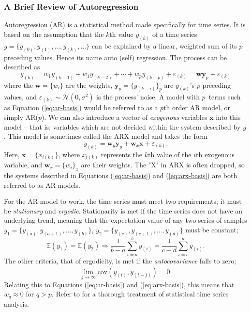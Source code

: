 \documentclass[]{article}
\begin{document}
\subsubsection{A Brief Review of Autoregression} \label{sec:ar-review}
Autoregression (AR) is a statistical method made specifically for time series. It is based on the assumption that the $k$th value $y_{(k)}$ of a time series $y = \{y_{(0)}, y_{(1)}, ..., y_{(k)}, ...\}$ can be explained by a linear, weighted sum of its $p$ preceding values. Hence its name auto (self) regression. The process can be described as
\begin{equation} \label{eq:ar-basis}
	y_{(k)} = w_1 y_{(k-1)} + w_1 y_{(k-2)} + \cdots + w_p y_{(k-p)} + \varepsilon_{(k)} = \mathbf{w} \mathbf{y}_p + \varepsilon_{(k)}
\end{equation}
where the $\mathbf{w} = \{w_{i}\}$ are the weights, $\mathbf{y}_p = \{y_{(k-i)}\}_p$ are $y_{(k)}$'s $p$ preceding values, and $\varepsilon_{(k)} \sim \mathcal{N}(0,\sigma^2)$ is the process' noise. A model with $p$ terms such as Equation (\ref{eq:ar-basis}) would be referred to as a $p$th order AR model, or simply AR($p$). We can also introduce a vector of \textit{exogenous} variables $\mathbf{x}$ into this model -- that is; variables which are not decided within the system described by $y$. This model is sometimes called the ARX model and takes the form
\begin{equation} \label{eq:arx-basis}
	y_{(k)} = \mathbf{w}_y \mathbf{y}_p + \mathbf{w}_x \mathbf{x} + \varepsilon_{(k)}.
\end{equation}
Here, $\mathbf{x} = \{x_{i(k)}\}$, where $x_{i(k)}$ represents the $k$th value of the $i$th exogenous variable, and $\mathbf{w}_x = \{w_i\}_x$ are their weights. The "X" in ARX is often dropped, so the systems described in Equations (\ref{eq:ar-basis}) and (\ref{eq:arx-basis}) are both referred to as AR models. 

For the AR model to work, the time series must meet two requirements; it must be \textit{stationary} and \textit{ergodic}. Stationarity is met if the time series does not have an underlying trend, meaning that the expectation value of any two series of samples $y_1 = \{y_{(a)}, y_{(a+1)}, ..., y_{(b)}\}$, $y_2 = \{y_{(c)}, y_{(c+1)}, ..., y_{(d)}\}$ must be constant;
\begin{equation} \label{eq:stationarity}
	\mathbb{E}(y_1) = \mathbb{E}(y_2) \Rightarrow \frac{1}{b-a} \sum_{i=a}^{b} y_{(i)} = \frac{1}{c-d} \sum_{i=c}^{d} y_{(i)}.
\end{equation}
The other criteria, that of ergodicity, is met if the \textit{autocovariance} falls to zero;
\begin{equation} \label{eq:ergodicity}
	\lim\limits_{j \rightarrow \infty} \mathrm{cov}(y_{(t)}, y_{(t-j)}) = 0.
\end{equation}
Relating this to Equations (\ref{eq:ar-basis}) and (\ref{eq:arx-basis}), this means that $w_q \approx 0$ for $q > p$. Refer to \cite{shumway2017} for a thorough treatment of statistical time series analysis.
\end{document}
